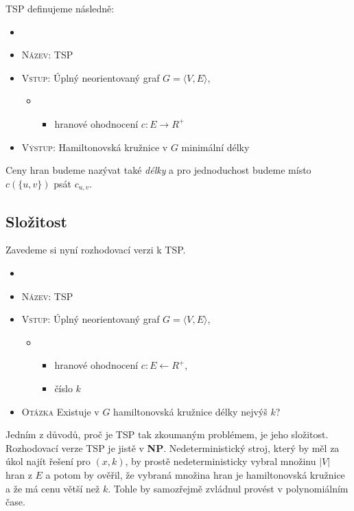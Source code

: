 \documentclass[
  printversion=false,
  joinlists=true,
  glossaries=true,
  figures=true,
  tables=true,
  sourcecodes=false,
  theorems=false,
  bibencoding=utf8,
  language=czech,
  encoding=utf8,
  program=infpvs,
  index=true,
  biblatex=true
]{kidiplom}
\begin{document}
TSP definujeme následně:
\begin{definition}
\begin{itemize}[label={}]
  \item
  \item \textsc{Název}: TSP
  \item \textsc{Vstup}: Úplný neorientovaný graf $G=\langle V, E \rangle$,
  \begin{itemize}[label={}]
  \item \begin{itemize}[label={}]
  \item hranové ohodnocení $c : E \rightarrow R^+$
  \end{itemize}
  \end{itemize}
  \item \textsc{Výstup}: Hamiltonovská kružnice v $G$ minimální délky
\end{itemize}
\end{definition}

Ceny hran budeme nazývat také \textit{délky} a pro jednoduchost budeme místo $c(\{u, v\})$ psát $c_{u, v}$.

\subsection{Složitost}
Zavedeme si nyní rozhodovací verzi k TSP.
\begin{definition}
\begin{itemize}[label={}]
  \item
  \item \textsc{Název}: TSP
  \item \textsc{Vstup}: Úplný neorientovaný graf $G=\langle V, E \rangle$,
  \begin{itemize}[label={}]
  \item \begin{itemize}[label={}]
  \item hranové ohodnocení $c : E \leftarrow R^+$,
  \item číslo $k$
  \end{itemize}
  \end{itemize}
  \item \textsc{Otázka} Existuje v $G$ hamiltonovská kružnice délky nejvýš $k$?
\end{itemize}
\end{definition}

Jedním z důvodů, proč je TSP tak zkoumaným problémem, je jeho složitost. Rozhodovací verze TSP je jistě v \textbf{NP}. Nedeterministický stroj, který by měl za úkol najít řešení pro $(x,k)$, by prostě nedeterministicky vybral množinu $|V|$ hran z $E$ a potom by ověřil, že vybraná množina hran je hamiltonovská kružnice a že má cenu větší než $k$. Tohle by samozřejmě zvládnul provést v  polynomiálním čase.
\end{document}
